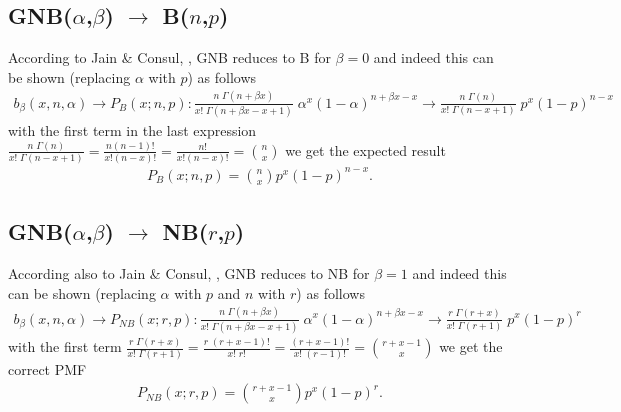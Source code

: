\subsection*{GNB($\alpha$,$\beta$) $\rightarrow$ B($n$,$p$)}
According to Jain \& Consul, \cite{jain1971generalized}, GNB reduces to B for $\beta = 0$ and 
indeed this can be shown (replacing $\alpha$ with $p$) as follows
\begin{align*}
 b_{\beta}(x,n,\alpha) \rightarrow P_{B}(x;n,p): %
 \frac{n \; \Gamma(n+\beta x)}{x! \;\Gamma(n + \beta x - x +1)}  \; \alpha^x (1-\alpha)^{n+\beta x-x} \rightarrow 
\frac{n \; \Gamma(n)}{x! \;\Gamma(n - x +1)}  \; p^x (1-p	)^{n-x} 
\end{align*}
with the first term in the last expression $\frac{n \; \Gamma(n)}{x! \;\Gamma(n - x +1)} = \frac{n (n-1)!}{x! (n-x)!} 
= \frac{n!}{x!(n-x)!} = {n \choose x}$ we get the expected result
\begin{align*}
P_{B}(x;n,p) = {n \choose x} p^x (1-p)^{n-x}. %
\end{align*}

\subsection*{GNB($\alpha$,$\beta$) $\rightarrow$ NB($r$,$p$)}
According also to Jain \& Consul, \cite{jain1971generalized}, GNB reduces to NB for $\beta = 1$ and 
indeed this can be shown (replacing $\alpha$ with $p$ and $n$ with $r$) as follows
\begin{align*}
 b_{\beta}(x,n,\alpha) \rightarrow P_{N\!B}(x;r,p):
 \frac{n \; \Gamma(n+\beta x)}{x! \;\Gamma(n + \beta x - x +1)}  \; \alpha^x (1-\alpha)^{n+\beta x-x} \rightarrow 
\frac{r \; \Gamma(r + x)}{x! \;\Gamma(r + 1)}  \; p^x (1-p)^{r} 
\end{align*}
with the first term $\frac{r \; \Gamma(r + x)}{x! \;\Gamma(r + 1)} = \frac{r \; (r + x - 1)!}{x! \;r!} = \frac{(r + x - 1)!}{x! \;(r-1)!}
= {r + x - 1 \choose x}$ we get the correct PMF
\begin{align*}
P_{N\!B}(x;r,p) = {r + x - 1 \choose x} p^x (1-p)^r  .
\end{align*}



